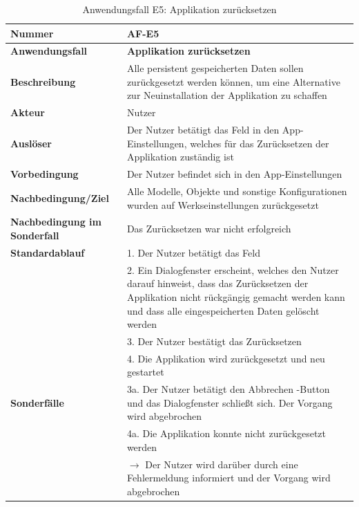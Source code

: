 \documentclass[oneside]{ausarbeitung}
\begin{document}
\begin{table}[htbp]
	\centering
	\begin{tabular}{|l|p{80mm}|}
		\hline
		\textbf{Nummer} & \textbf{AF-E5} \\ \hline
		\textbf{Anwendungsfall} & \textbf{Applikation zurücksetzen} \\ \hline
		\textbf{Beschreibung} & Alle persistent gespeicherten Daten sollen zurückgesetzt werden können, um eine Alternative zur Neuinstallation der Applikation zu schaffen\\ \hline
		\textbf{Akteur} & Nutzer \\ \hline
		\textbf{Auslöser} & Der Nutzer betätigt das Feld in den App-Einstellungen, welches für das Zurücksetzen der Applikation zuständig ist \\ \hline
		\textbf{Vorbedingung} & Der Nutzer befindet sich in den App-Einstellungen\\ \hline
		\textbf{Nachbedingung/Ziel} & Alle Modelle, Objekte und sonstige Konfigurationen wurden auf Werkseinstellungen zurückgesetzt \\ \hline
		\textbf{Nachbedingung im Sonderfall} & Das Zurücksetzen war nicht erfolgreich \\ \hline
		\textbf{Standardablauf} & 1. Der Nutzer betätigt das Feld \\
		& 2. Ein Dialogfenster erscheint, welches den Nutzer darauf hinweist, dass das Zurücksetzen der Applikation nicht rückgängig gemacht werden kann und dass alle eingespeicherten Daten gelöscht werden \\ 
		& 3. Der Nutzer bestätigt das Zurücksetzen \\
		& 4. Die Applikation wird zurückgesetzt und neu gestartet \\ \hline
		\textbf{Sonderfälle} & 3a. Der Nutzer betätigt den \glqq Abbrechen \grqq-Button und das Dialogfenster schließt sich. Der Vorgang wird abgebrochen \\
		& 4a. Die Applikation konnte nicht zurückgesetzt werden \\ & $\rightarrow$ Der Nutzer wird darüber durch eine Fehlermeldung informiert und der Vorgang wird abgebrochen \\ \hline
		
	\end{tabular}
	\caption{Anwendungsfall E5: Applikation zurücksetzen}
	\label{tab:use-case-reset}
\end{table}

\end{document}
